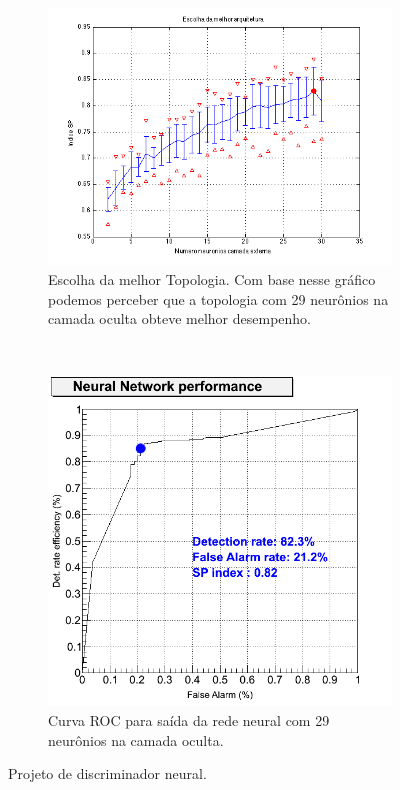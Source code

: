 \begin{figure}[htpb!]
    \centering
        \begin{subfigure}[b]{0.45\textwidth}
                \centering
            \includegraphics[width=\textwidth]{images/minbias/plotSP.png}
            \caption{Escolha da melhor Topologia. Com base nesse gráfico podemos
            perceber que a topologia com 29 neurônios na camada oculta obteve
            melhor desempenho.}
            \label{fig:Topologyminbias}
        \end{subfigure}%
        ~
        \begin{subfigure}[b]{0.45\textwidth}
                \centering
                \includegraphics[width=\textwidth]{images/minbias/C_roc_nn.png}
            \caption{Curva ROC para saída da rede neural com 29 neurônios na
            camada oculta.}
            \label{fig:ROCNNminbias}
        \end{subfigure}
        \caption{Projeto de discriminador neural.}
\end{figure}

